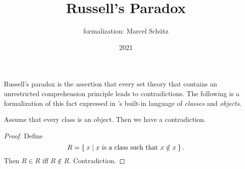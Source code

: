 \documentclass{article}
\title{Russell's Paradox}
\author{\Naproche formalization:
Marcel Schütz}
\date{2021}
\begin{document}

  \maketitle

  Russell's paradox is the assertion that every set theory that contains an
  unrestricted comprehension principle leads to contradictions.
  The following is a formalization of this fact expressed in \Naproche's
  built-in language of \textit{classes} and \textit{objects}.

  \begin{forthel}
    \begin{theorem}[Russell]
      Assume that every class is an object.
      Then we have a contradiction.
    \end{theorem}
    \begin{proof}
      Define \[ R = \Set{x | \text{$x$ is a class such that $x \notin x$}}. \]
      Then $R \in R$ iff $R \notin R$.
      Contradiction.
    \end{proof}
  \end{forthel}
\end{document}
